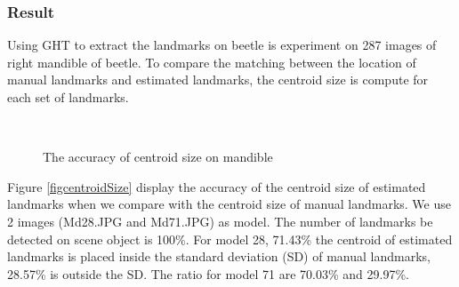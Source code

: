 \subsubsection{Result}
Using GHT to extract the landmarks on beetle is experiment on 287 images of right mandible of beetle. To compare the matching between the location of manual landmarks and estimated landmarks, the centroid size is compute for each set of landmarks.\\[0.2cm]
\begin{figure}[h!]
\centering
{}~~
\caption{The accuracy of centroid size on mandible}
\label{figpca}
\end{figure}
Figure \ref{figcentroidSize} display the accuracy of the centroid size of estimated landmarks when we compare with the centroid size of manual landmarks. We use 2 images (Md28.JPG and Md71.JPG) as model. The number of landmarks be detected on scene object is 100\%. For model 28, 71.43\% the centroid of estimated landmarks is placed inside the standard deviation (SD) of manual landmarks, 28.57\% is outside the SD. The ratio for model 71 are 70.03\% and 29.97\%.
